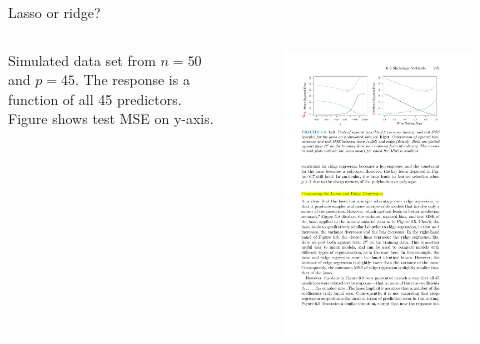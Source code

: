 \documentclass[mathserif]{beamer}
\begin{document}
\begin{frame}{Lasso or ridge?}


\begin{columns}
Simulated data set from $n=50$ and $p=45$.  The response is a function of all 45 predictors.  Figure shows test MSE on y-axis.\\~\\
\begin{figure}
\includegraphics[scale=1]{lasso-v-ridge-45variables}
\end{figure}


\end{columns}
\end{frame}
\end{document}
